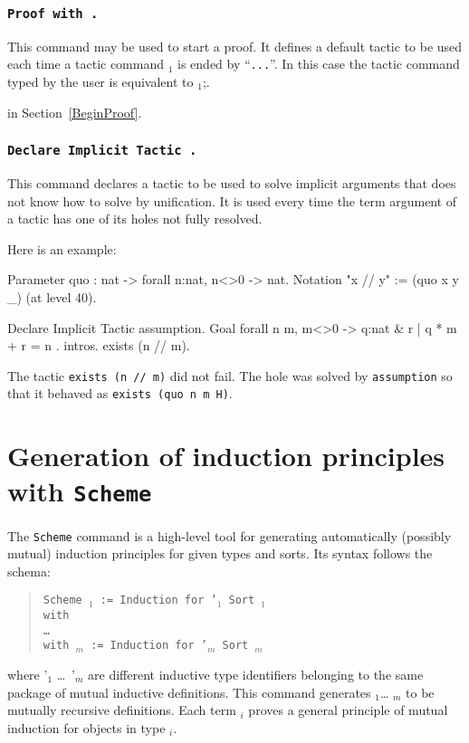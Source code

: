 \subsubsection[\tt Proof with {\tac}.]{\tt Proof with {\tac}.\label{ProofWith}
}

  This command may be used to start a proof. It defines a default
  tactic to be used each time a tactic command {\tac$_1$} is ended by
  ``\verb#...#''. In this case the tactic command typed by the user is
  equivalent to \tac$_1$;{\tac}.

 in Section~\ref{BeginProof}.

\subsubsection[\tt Declare Implicit Tactic {\tac}.]{\tt Declare Implicit Tactic {\tac}.}

This command declares a tactic to be used to solve implicit arguments
that {\Coq} does not know how to solve by unification. It is used
every time the term argument of a tactic has one of its holes not
fully resolved.

Here is an example:

\begin{coq_example}
Parameter quo : nat -> forall n:nat, n<>0 -> nat.
Notation "x // y" := (quo x y _) (at level 40).

Declare Implicit Tactic assumption.
Goal forall n m, m<>0 -> { q:nat & { r | q * m + r = n } }.
intros.
exists (n // m).
\end{coq_example}

The tactic {\tt exists (n // m)} did not fail. The hole was solved by
{\tt assumption} so that it behaved as {\tt exists (quo n m H)}.

\section{Generation of induction principles with {\tt Scheme}
\label{Scheme}
}

The {\tt Scheme} command is a high-level tool for generating
automatically (possibly mutual) induction principles for given types
and sorts.  Its syntax follows the schema:
\begin{quote}
{\tt Scheme {\ident$_1$} := Induction for \ident'$_1$ Sort {\sort$_1$} \\
  with\\
  \mbox{}\hspace{0.1cm} \dots\\
        with {\ident$_m$} := Induction for {\ident'$_m$} Sort
        {\sort$_m$}}
\end{quote}
where \ident'$_1$ \dots\ \ident'$_m$ are different inductive type
identifiers belonging to the same package of mutual inductive
definitions. This command generates {\ident$_1$}\dots{} {\ident$_m$}
to be mutually recursive definitions. Each term {\ident$_i$} proves a
general principle of mutual induction for objects in type {\term$_i$}.

